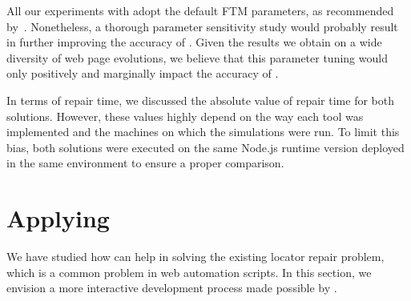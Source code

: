 All our experiments with \erratum adopt the default FTM parameters, as recommended by~\cite{Kumar2011_FTM}.
Nonetheless, a thorough parameter sensitivity study would probably result in further improving the accuracy of \erratum.
Given the results we obtain on a wide diversity of web page evolutions, we believe that this parameter tuning would only positively and marginally impact the accuracy of \erratum.

In terms of repair time, we discussed the absolute value of repair time for both solutions.
However, these values highly depend on the way each tool was implemented and the machines on which the simulations were run.
To limit this bias, both solutions were executed on the same Node.js runtime version deployed in the same environment to ensure a proper comparison.

\section{Applying \erratum}\label{erratum:sec:perspectives}
We have studied how \erratum{} can help in solving the existing locator repair problem, which is a common problem in web automation scripts.
In this section, we envision a more interactive development process made possible by \erratum{}.


